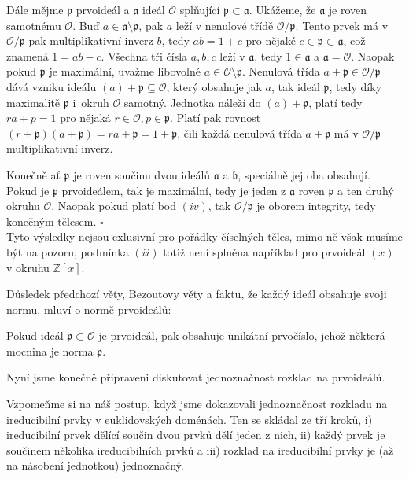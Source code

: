 \documentclass[12pt]{report}
\begin{document}
Dále mějme $\mathfrak{p}$ prvoideál a $\mathfrak{a}$ ideál $\mathcal{O}$ splňující $\mathfrak{p} \subset \mathfrak{a}$. Ukážeme, že $\mathfrak{a}$ je roven samotnému $\mathcal{O}$. Buď $a \in \mathfrak{a} \setminus \mathfrak{p}$, pak $a$ leží v nenulové třídě $\mathcal{O}/\mathfrak{p}$. Tento prvek má v $\mathcal{O}/\mathfrak{p}$ pak multiplikativní inverz $b$, tedy $ab=1+c$ pro nějaké $c \in \mathfrak{p} \subset \mathfrak{a}$, což znamená $1 = ab-c$. Všechna tři čísla $a,b,c$ leží v $\mathfrak{a}$, tedy $1 \in \mathfrak{a}$ a $\mathfrak{a} = \mathcal{O}$. Naopak pokud $\mathfrak{p}$ je maximální, uvažme libovolné $a \in \mathcal{O}\setminus\mathfrak{p}$. Nenulová třída $a+\mathfrak{p} \in \mathcal{O}/\mathfrak{p}$ dává vzniku ideálu $(a)+\mathfrak{p} \subseteq \mathcal{O}$, který obsahuje jak $a$, tak ideál $\mathfrak{p}$, tedy díky maximalitě $\mathfrak{p}$ i~okruh $\mathcal{O}$ samotný. Jednotka náleží do $(a)+\mathfrak{p}$, platí tedy $ra+p = 1$ pro nějaká $r \in \mathcal{O}, p \in \mathfrak{p}$. Platí pak rovnost $(r+\mathfrak{p})(a+\mathfrak{p}) = ra+\mathfrak{p} = 1+\mathfrak{p}$, čili každá nenulová třída $a+\mathfrak{p}$ má v $\mathcal{O}/\mathfrak{p}$ multiplikativní inverz.

Konečně ať $\mathfrak{p}$ je roven součinu dvou ideálů $\mathfrak{a}$ a $\mathfrak{b}$, speciálně jej oba obsahují. Pokud je $\mathfrak{p}$ prvoideálem, tak je maximální, tedy je jeden z $\mathfrak{a}$ roven $\mathfrak{p}$ a ten druhý okruhu $\mathcal{O}$. Naopak pokud platí bod $(iv)$, tak $\mathcal{O}/\mathfrak{p}$ je oborem integrity, tedy konečným tělesem. \hfill $\square$\\


Tyto výsledky nejsou exlusivní pro pořádky číselných těles, mimo ně však musíme být na pozoru, podmínka $(ii)$ totiž není splněna například pro prvoideál $(x)$ v okruhu $\mathbb{Z}[x]$.

Důsledek předchozí věty, Bezoutovy věty a faktu, že každý ideál obsahuje svoji normu, mluví o normě prvoideálů:
\begin{dusledek}
Pokud ideál $\mathfrak{p} \subset \mathcal{O}$ je prvoideál, pak obsahuje unikátní prvočíslo, jehož některá mocnina je norma $\mathfrak{p}$.
\end{dusledek}

Nyní jsme konečně připraveni diskutovat jednoznačnost rozklad na prvoideálů.

Vzpomeňme si na náš postup, když jsme dokazovali jednoznačnost rozkladu na ireducibilní prvky v euklidovských doménách. Ten se skládal ze tří kroků, i)  ireducibilní prvek dělící součin dvou prvků dělí jeden z nich, ii) každý prvek je součinem několika ireducibilních prvků a iii) rozklad na ireducibilní prvky je (až na násobení jednotkou) jednoznačný.
\end{document}
